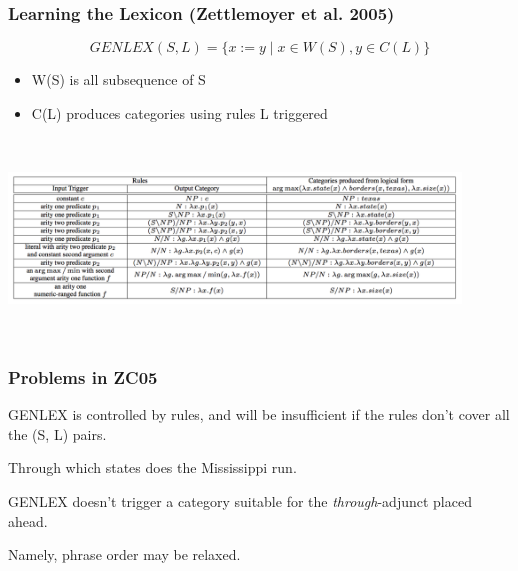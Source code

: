 \documentclass{beamer}
\begin{document}
\begin{frame}
    \frametitle{Learning the Lexicon (Zettlemoyer et al. 2005)}

    \[
        GENLEX(S,L) = \{x := y \mid x \in W(S), y\in C(L)\}
    \]

    \begin{itemize}
        \item W(S) is all subsequence of S
        \item C(L) produces categories using rules L triggered
    \end{itemize}

    \begin{center}
        \includegraphics[height=5.32cm,width=12cm]{img/zc05-triggers.png}
    \end{center}

\end{frame}

\begin{frame}
    \frametitle{Problems in ZC05}

    GENLEX is controlled by rules, and will be insufficient
    if the rules don't cover all the (S, L) pairs.

    \begin{examples}
    Through which states does the Mississippi run.
    \end{examples}

    GENLEX doesn't trigger a category suitable for the \emph{through}-adjunct placed ahead.

    Namely, phrase order may be relaxed.
\end{frame}
\end{document}

